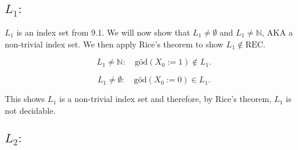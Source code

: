 

\setcounter{section}{1}

\subsection{$L_1:$}
$L_1$ is an index set from 9.1. We will now show that $L_1 \neq \emptyset$ and $L_1 \neq \mathbb{N}$, AKA a non-trivial index set.  
We then apply Rice's theorem to show $L_1 \notin \text{REC}$.

\[
L_1 \neq \mathbb{N}: \quad \text{göd}(X_0 := 1) \notin L_1.
\]

\[
L_1 \neq \emptyset: \quad \text{göd}(X_0 := 0) \in L_1.
\]

This shows $L_1$ is a non-trivial index set and therefore, by Rice's theorem, $L_1$ is not decidable.

\subsection{$L_2:$}


